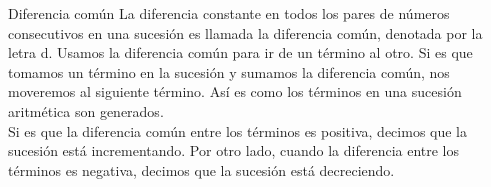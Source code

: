 \begin{infocard}{Diferencia común}
    La diferencia constante en todos los pares de números consecutivos en una sucesión es llamada la diferencia común, denotada por la letra d. Usamos la diferencia común para ir de un término al otro. Si es que tomamos un término en la sucesión y sumamos la diferencia común, nos moveremos al siguiente término. Así es como los términos en una sucesión aritmética son generados.\\

    Si es que la diferencia común entre los términos es positiva, decimos que la sucesión está incrementando. Por otro lado, cuando la diferencia entre los términos es negativa, decimos que la sucesión está decreciendo.
\end{infocard}